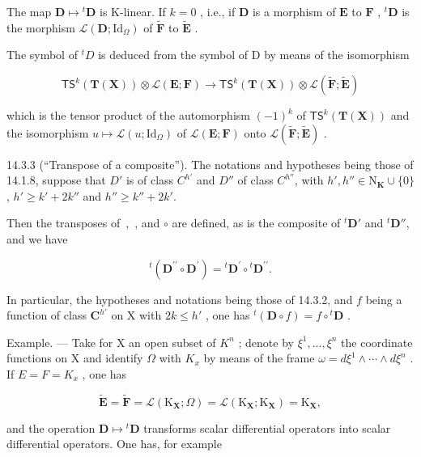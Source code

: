 The map \(\mathbf{D} \mapsto {}^t\mathbf{D}\) is K-linear. If \(k = 0\) , i.e., if \(\mathbf{D}\) is a morphism of \(\mathbf{E}\) to \(\mathbf{F}\) , \({}^t\mathbf{D}\) is the morphism \(\mathcal{L}(\mathbf{D}; \mathrm{Id}_{\Omega})\) of \(\tilde{\mathbf{F}}\) to \(\tilde{\mathbf{E}}\) .

The symbol of \({}^{t}D\) is deduced from the symbol of D by means of the isomorphism

\[
\mathsf {T S} ^ {k} (\mathbf {T} (\mathbf {X})) \otimes \mathscr {L} (\mathbf {E}; \mathbf {F}) \rightarrow \mathsf {T S} ^ {k} (\mathbf {T} (\mathbf {X})) \otimes \mathscr {L} (\tilde {\mathbf {F}}; \tilde {\mathbf {E}})
\]

which is the tensor product of the automorphism \((-1)^{k}\) of \(\mathsf{T}\mathsf{S}^{k}(\mathbf{T}(\mathbf{X}))\) and the isomorphism \(u\mapsto\mathcal{L}(u;\mathrm{Id}_{\Omega})\) of \(\mathcal{L}(\mathbf{E};\mathbf{F})\) onto \(\mathcal{L}(\tilde{\mathbf{F}};\tilde{\mathbf{E}})\) .

14.3.3 (“Transpose of a composite”). The notations and hypotheses being those of 14.1.8, suppose that \(D'\) is of class \(C^{h'}\) and \(D''\) of class \(C^{h''}\), with \(h',h'' \in \mathrm{N}_{\mathbf{K}} \cup \{0\}\), \(h' \geqslant k' + 2k''\) and \(h'' \geqslant k'' + 2k'\).

Then the transposes of \,, \,, and \(\circ\) are defined, as is the composite of \(^t\mathbf{D}'\) and \(^t\mathbf{D}''\), and we have

\[
{ } ^ { t } ( \mathbf { D } ^ { \prime \prime } \circ \mathbf { D } ^ { \prime } ) = { } ^ { t } \mathbf { D } ^ { \prime } \circ { } ^ { t } \mathbf { D } ^ { \prime \prime } .
\]

In particular, the hypotheses and notations being those of 14.3.2, and \(f\) being a function of class \(\mathbf{C}^{h'}\) on X with \(2k \leqslant h'\) , one has \({}^t(\mathbf{D} \circ f) = f \circ {}^t\mathbf{D}\) .

Example. --- Take for X an open subset of \(K^{n}\) ; denote by \(\xi^{1}, \ldots, \xi^{n}\) the coordinate functions on X and identify \(\Omega\) with \(K_{x}\) by means of the frame \(\omega = d\xi^{1} \wedge \cdots \wedge d\xi^{n}\) . If \(E = F = K_{x}\) , one has

\[
\tilde {\mathbf {E}} = \tilde {\mathbf {F}} = \mathcal {L} (\mathrm{K}_{\mathbf{X}}; \Omega) = \mathcal {L} (\mathrm{K}_{\mathbf{X}}; \mathrm{K}_{\mathbf{X}}) = \mathrm{K}_{\mathbf{X}},
\]

and the operation \(\mathbf{D} \mapsto {}^{t}\mathbf{D}\) transforms scalar differential operators into scalar differential operators. One has, for example

